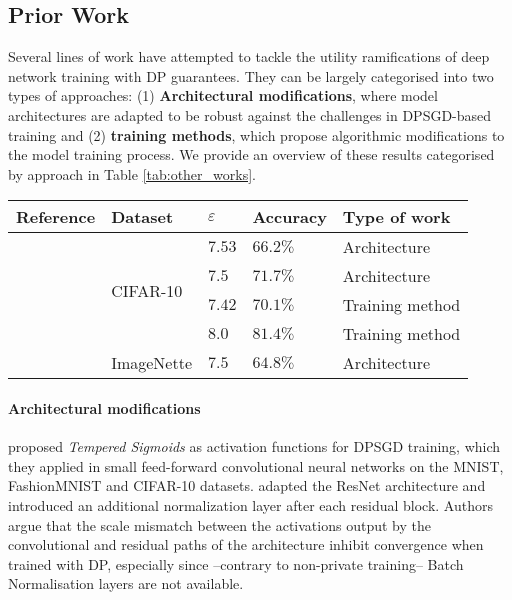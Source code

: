 \documentclass[nohyperref]{article}
\theoremstyle{plain}
\theoremstyle{definition}
\theoremstyle{remark}
\begin{document}
\subsection{Prior Work}
\label{sec:prior_work}
Several lines of work have attempted to tackle the utility ramifications of deep network training with \acl{DP} guarantees. They can be largely categorised into two types of approaches: (1) \textbf{Architectural modifications}, where model architectures are adapted to be robust against the challenges in \acs{DPSGD}-based training and (2) \textbf{training methods}, which propose algorithmic modifications to the model training process. We provide an overview of these results categorised by approach in Table \ref{tab:other_works}. 
\begin{table*}[ht]
    \centering
    \begin{tabular}{@{}lllll@{}}
    \toprule
        Reference & Dataset & $\varepsilon$ & Accuracy & Type of work \\ \midrule
        \citealt{papernot2020tempered} & \multirow{4}{*}{CIFAR-10} & $7.53$ & $66.2\%$ & Architecture \\
        \citealt{klause2022differentially} & & $7.5$ & $71.7\%$ & Architecture \\
        \citealt{dormann2021not} & & $7.42$ & $70.1\%$ & Training method \\
        \citealt{de2022unlocking} & & $8.0$ & $81.4\%$ & Training method \\ \midrule
        \citealt{klause2022differentially} & ImageNette & $7.5$ & $64.8\%$ & Architecture\\
    \bottomrule
    \end{tabular}
    \caption{Results of other works on the same datasets utilised in our study. \textit{Type of work} refers to the categories specified in Section \ref{sec:prior_work}.}
    \label{tab:other_works}
\end{table*}
\paragraph{Architectural modifications}

\citeauthor{papernot2020tempered} proposed \textit{Tempered Sigmoids} as activation functions for \acs{DPSGD} training, which they applied in small feed-forward convolutional neural networks on the MNIST, FashionMNIST and CIFAR-10 datasets. \citeauthor{klause2022differentially} adapted the ResNet architecture \cite{he2016deep} and introduced an additional normalization layer after each residual block. Authors argue that the scale mismatch between the activations output by the convolutional and residual paths of the architecture inhibit convergence when trained with \acs{DP}, especially since --contrary to non-private training-- Batch Normalisation layers \cite{ioffe2015batch} are not available.
\end{document}
